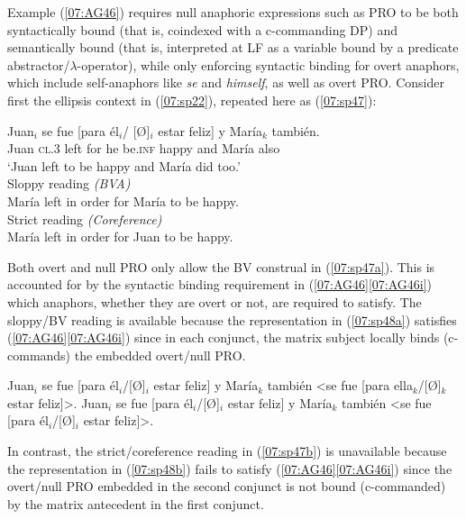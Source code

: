 \documentclass[output=paper,colorlinks,citecolor=brown,draft,draftmode]{langscibook}
\begin{document}
Example (\ref{07:AG46}) requires null anaphoric expressions such as PRO to be both syntactically bound (that is, coindexed with a c-commanding DP) and semantically bound (that is, interpreted at LF as a variable bound by a predicate abstractor/$\lambda$-operator), while only enforcing syntactic binding for overt anaphors, which include self-anaphors like \textit{se} and \textit{himself}, as well as overt PRO.
Consider first the ellipsis context in (\ref{07:sp22}), repeated here as (\ref{07:sp47}):

\begin{exe}
\ex\label{07:sp47}
\gll Juan$_i$ se fue [para él$_{i}$/ [Ø]$_{i}$ estar feliz] y María$_k$ también.\\
Juan \textsc{cl.3} left for he {} be.\textsc{inf} happy and María also\\
\glt ‘Juan left to be happy and María did too.’\\
\ea\label{07:sp47a}\cmark Sloppy reading \textit{(BVA)}\\
María left in order for María to be happy.\\
\ex\label{07:sp47b}\xmark Strict reading \textit{(Coreference)}\\
María left in order for Juan to be happy.\\
\z
\end{exe}


Both overt and null PRO only allow the BV construal in (\ref{07:sp47a}). This is accounted for by the syntactic binding requirement in (\ref{07:AG46}\ref{07:AG46i}) which anaphors, whether they are overt or not, are required to satisfy. The sloppy/BV reading is available because the representation in (\ref{07:sp48a}) satisfies (\ref{07:AG46}\ref{07:AG46i}) since in each conjunct, the matrix subject locally binds (c-commands)  the embedded overt/null PRO.

\ea \label{07:sp48}
\ea\label{07:sp48a}\cmark Juan$_i$ se fue [para él$_{i}$/[Ø]$_{i}$ estar feliz] y María$_k$ también <se fue [para ella$_k$/[Ø]$_{k}$ estar feliz]>.
\ex\label{07:sp48b}\xmark Juan$_i$ se fue [para él$_{i}$/[Ø]$_{i}$ estar feliz]  y María$_k$ también <se fue [para él$_{i}$/[Ø]$_{i}$ estar feliz]>.
\z
\z


In contrast, the strict/coreference reading in (\ref{07:sp47b}) is unavailable because the representation in (\ref{07:sp48b}) fails to satisfy (\ref{07:AG46}\ref{07:AG46i}) since the overt/null PRO embedded in the second conjunct is not bound (c-commanded) by the matrix antecedent in the first conjunct.
\end{document}
